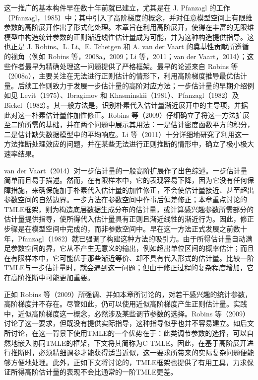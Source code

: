 这一推广的基本构件早在数十年前就已建立，尤其是在 J. Pfanzagl 的工作（Pfanzagl，1985）中；其中引入了高阶梯度的概念，并对任意模型空间上有限维参数的高阶展开作出了形式化处理。本章旨在利用高阶展开，使得在丰富的无限维模型中构造统计参数的正则渐近线性估计量成为可能，并为这种构造提供指导。这也正是 J. Robins、L. Li、E. Tchetgen 和 A. van der Vaart 的奠基性贡献所遵循的视角（例如 Robins 等，2008a，2009；Li 等，2011；van der Vaart，2014）；这些作者最早为精确处理这一问题提供了严格框架。最早的论述来自 Robins 等（2008a），主要关注在无法进行正则估计的情形下，利用高阶梯度推导最优估计量。后续工作则致力于发展一步估计量的高阶对应方法；一步估计量的早期介绍例如见 Levit（1975）、Ibragimov 和 Khasminskii（1981）、Pfanzagl（1982）及 Bickel（1982）。其一般方法是，识别朴素代入估计量渐近展开中的主导项，并据此对这一朴素估计量作加性修正。Robins 等（2009）仔细确立了将这一方法扩展至二阶所需的基础，并在两个问题中展示其用法：一是估计密度函数平方的积分，二是估计缺失数据模型中的平均响应。Li 等（2011）十分详细地研究了利用这一方法推断处理效应的问题，并在某些无法进行正则推断的情形中，确立了极小极大速率结果。

van der Vaart（2014）对一步估计量的一般高阶扩展作了出色综述。一步估计量简单而且易于描述。然而，在有限样本中，它的表现容易下降，因为它没有任何保障措施，来确保施加于朴素代入估计量的加性修正，不会使估计量接近、甚至超出参数空间的自然边界。一步方法在参数空间中作事后偏差修正；本章重点讨论的TMLE框架，则为构造底层数据生成分布的估计量，或计算感兴趣参数所需部分的估计量提供指导，使所得代入估计量具有正则且渐近线性的渐近行为。因此，修正步骤是在模型空间中完成的，而非参数空间中。早在这一方法正式发展之前数十年，Pfanzagl（1982）就已强调了构建这种方法的吸引力。由于所得估计量自动满足参数空间的界，它从不产生无意义的输出，例如超出单位区间的概率估计；而且在有限样本中，它可能优于那些渐近等价、却不具有代入形式的估计量。比较一阶TMLE与一步估计量时，就会遇到这一问题；但由于修正过程的复杂程度增加，它在高阶推断中可能更加重要。

正如 Robins 等（2009）所强调、并如本章所讨论的，对若干感兴趣的统计参数，高阶梯度并不存在。尽管如此，仍可以使用近似高阶梯度产生正则估计量。实践中，近似高阶梯度这一概念，必然涉及某些调节参数的选择。Robins 等（2009）讨论了这一要求，但既没有提供实际指导，这种指导似乎也并不容易建立。如后文所讨论，在这一背景下使用TMLE的一个优势在于：此类调节参数的选择，可以自然地嵌入协同TMLE的框架，下文将其简称为C-TMLE。因此，在基于高阶展开进行推断时，必须精细调参才能获得适当近似，这一要求所带来的实际复杂问题便能够方便地处理。此外，正如下文将讨论的，TMLE框架也提供了有用工具，力求保证所得高阶估计量的表现不会比通常的一阶TMLE更差。

